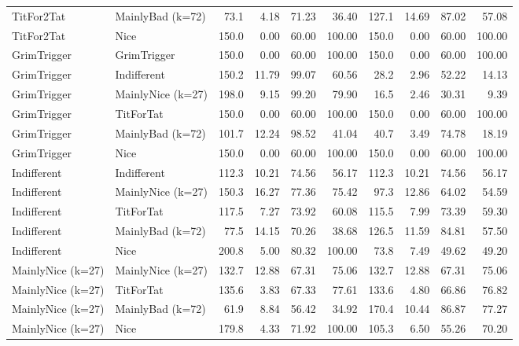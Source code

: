\documentclass[journal,a4paper,10pt,twoside]{IEEEtran} %
\begin{document}
\begin{table}[ht]
\begin{tabular}{ll|rrrr|rrrr}
		TitFor2Tat        & MainlyBad (k=72)  &  73.1 &  4.18 &  71.23 &      36.40 & 127.1 & 14.69 &  87.02 &      57.08 \\
		TitFor2Tat        & Nice              & 150.0 &  0.00 &  60.00 &     100.00 & 150.0 &  0.00 &  60.00 &     100.00 \\
		GrimTrigger       & GrimTrigger       & 150.0 &  0.00 &  60.00 &     100.00 & 150.0 &  0.00 &  60.00 &     100.00 \\
		GrimTrigger       & Indifferent       & 150.2 & 11.79 &  99.07 &      60.56 &  28.2 &  2.96 &  52.22 &      14.13 \\
		GrimTrigger       & MainlyNice (k=27) & 198.0 &  9.15 &  99.20 &      79.90 &  16.5 &  2.46 &  30.31 &       9.39 \\
		GrimTrigger       & TitForTat         & 150.0 &  0.00 &  60.00 &     100.00 & 150.0 &  0.00 &  60.00 &     100.00 \\
		GrimTrigger       & MainlyBad (k=72)  & 101.7 & 12.24 &  98.52 &      41.04 &  40.7 &  3.49 &  74.78 &      18.19 \\
		GrimTrigger       & Nice              & 150.0 &  0.00 &  60.00 &     100.00 & 150.0 &  0.00 &  60.00 &     100.00 \\
		Indifferent       & Indifferent       & 112.3 & 10.21 &  74.56 &      56.17 & 112.3 & 10.21 &  74.56 &      56.17 \\
		Indifferent       & MainlyNice (k=27) & 150.3 & 16.27 &  77.36 &      75.42 &  97.3 & 12.86 &  64.02 &      54.59 \\
		Indifferent       & TitForTat         & 117.5 &  7.27 &  73.92 &      60.08 & 115.5 &  7.99 &  73.39 &      59.30 \\
		Indifferent       & MainlyBad (k=72)  &  77.5 & 14.15 &  70.26 &      38.68 & 126.5 & 11.59 &  84.81 &      57.50 \\
		Indifferent       & Nice              & 200.8 &  5.00 &  80.32 &     100.00 &  73.8 &  7.49 &  49.62 &      49.20 \\
		MainlyNice (k=27) & MainlyNice (k=27) & 132.7 & 12.88 &  67.31 &      75.06 & 132.7 & 12.88 &  67.31 &      75.06 \\
		MainlyNice (k=27) & TitForTat         & 135.6 &  3.83 &  67.33 &      77.61 & 133.6 &  4.80 &  66.86 &      76.82 \\
		MainlyNice (k=27) & MainlyBad (k=72)  &  61.9 &  8.84 &  56.42 &      34.92 & 170.4 & 10.44 &  86.87 &      77.27 \\
		MainlyNice (k=27) & Nice              & 179.8 &  4.33 &  71.92 &     100.00 & 105.3 &  6.50 &  55.26 &      70.20 \\

\end{tabular}
\end{table}
\end{document}
